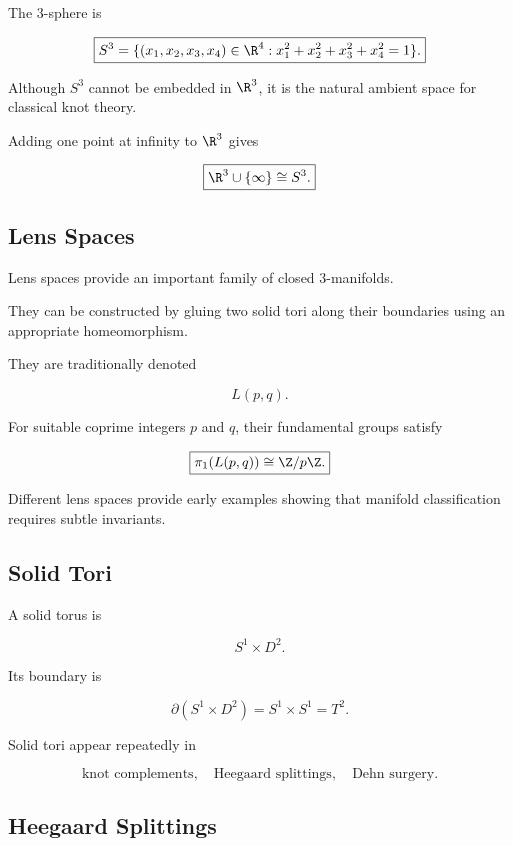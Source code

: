 The \(3\)-sphere is

\[
\boxed{
S^3
=
\{
(x_1,x_2,x_3,x_4)\in\R^4:
x_1^2+x_2^2+x_3^2+x_4^2=1
\}.
}
\]

Although \(S^3\) cannot be embedded in \(\R^3\), it is the natural ambient
space for classical knot theory.

Adding one point at infinity to \(\R^3\) gives

\[
\boxed{
\R^3\cup\{\infty\}
\cong
S^3.
}
\]

\subsection{Lens Spaces}
\label{subsec:lens-spaces}

Lens spaces provide an important family of closed \(3\)-manifolds.

They can be constructed by gluing two solid tori along their boundaries
using an appropriate homeomorphism.

They are traditionally denoted

\[
\boxed{
L(p,q).
}
\]

For suitable coprime integers \(p\) and \(q\), their fundamental groups
satisfy

\[
\boxed{
\pi_1(L(p,q))
\cong
\Z/p\Z.
}
\]

Different lens spaces provide early examples showing that manifold
classification requires subtle invariants.

\subsection{Solid Tori}
\label{subsec:solid-tori}

A solid torus is

\[
\boxed{
S^1\times D^2.
}
\]

Its boundary is

\[
\boxed{
\partial(S^1\times D^2)
=
S^1\times S^1
=
T^2.
}
\]

Solid tori appear repeatedly in

\[
\boxed{
\text{knot complements},
\quad
\text{Heegaard splittings},
\quad
\text{Dehn surgery}.
}
\]

\subsection{Heegaard Splittings}
\label{subsec:heegaard-splittings}

